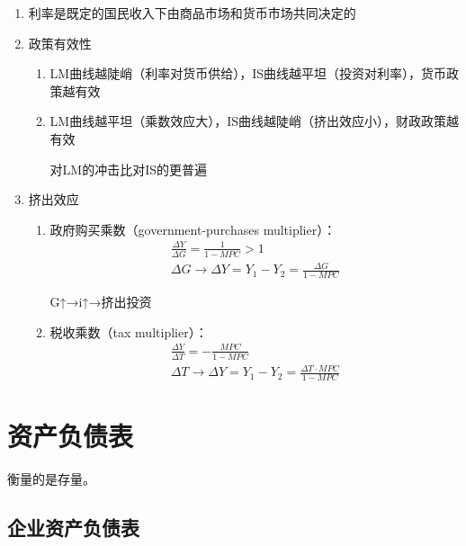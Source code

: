 \documentclass[12pt]{book}
\begin{document}
\begin{enumerate}[1.]
    \item 利率是既定的国民收入下由商品市场和货币市场共同决定的
    \item 政策有效性
          \begin{enumerate}[(1)]
              \item LM曲线越陡峭（利率对货币供给），IS曲线越平坦（投资对利率），货币政策越有效
              \item LM曲线越平坦（乘数效应大），IS曲线越陡峭（挤出效应小），财政政策越有效
                    \par 对LM的冲击比对IS的更普遍
          \end{enumerate}
    \item 挤出效应
          \begin{enumerate}[(1)]
              \item 政府购买乘数（government-purchases multiplier）：
                    \begin{gather*}
                        \frac{\Delta Y}{\Delta G}=\frac{1}{1-MPC}>1 \\
                        \Delta G\rightarrow \Delta Y=Y_1-Y_2=\frac{\Delta G}{1-MPC}
                    \end{gather*}
                    \par G↑→i↑→挤出投资
              \item 税收乘数（tax multiplier）：
                    \begin{gather*}
                        \frac{\Delta Y}{\Delta T}=-\frac{MPC}{1-MPC} \\
                        ΔT\rightarrow \Delta Y=Y_1-Y_2=\frac{\Delta T·MPC}{1-MPC}
                    \end{gather*}
          \end{enumerate}
\end{enumerate}












\chapter{资产负债表}

衡量的是存量。

\section{企业资产负债表}
\end{document}
